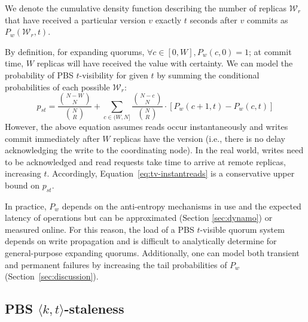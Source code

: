 \documentclass{vldb}
\newcommand{\subsectionskip}{-0em}
\begin{document}
We denote the cumulative density function describing the number of
replicas $\mathcal{W}_r$ that have received a particular version $v$
exactly $t$ seconds after $v$ commits as $P_w(\mathcal{W}_r, t)$.

By definition, for expanding quorums, $\forall c \in [0, W], P_w(c,0)
= 1$; at commit time, $W$ replicas will have received the value with
certainty.  We can model the probability of PBS $t$-visibility for given $t$ by summing the conditional probabilities of each possible
$\mathcal{W}_r$:
\begin{equation}
\label{eq:tv-instantreads}
p_{st} = \frac{{N-W \choose N}}{{N \choose R}}+\sum_{c\in(W, N]} \frac{{N-c \choose N}}{{N \choose R}}\cdot [P_w(c+1, t)-P_w(c,t)]
\end{equation}
However, the above equation assumes reads occur instantaneously and
writes commit immediately after $W$ replicas have the version (i.e.,
there is no delay acknowledging the write to the coordinating node).
In the real world, writes need to be acknowledged and read requests
take time to arrive at remote replicas, increasing $t$.  Accordingly,
Equation~\ref{eq:tv-instantreads} is a conservative upper bound on
$p_{st}$.

In practice, $P_w$ depends on the anti-entropy mechanisms in use and
the expected latency of operations but can be approximated (Section
\ref{sec:dynamo}) or measured online.  For this reason, the load of a
PBS $t$-visible quorum system depends on write propagation and is
difficult to analytically determine for general-purpose expanding
quorums.  Additionally, one can model both transient and permanent
failures by increasing the tail probabilities of $P_w$
(Section~\ref{sec:discussion}).


\vspace{\subsectionskip}\subsection{PBS $\langle k, t \rangle$-staleness}
\end{document}
